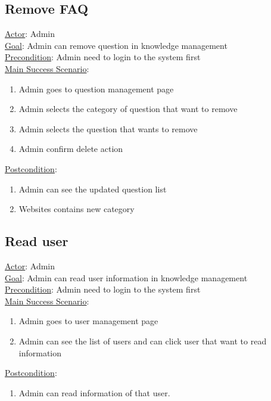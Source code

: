 \documentclass[12pt,oneside,openright,a4paper]{cpe-english-project}
\begin{document}
\subsection{Remove FAQ}
\underline{Actor}: Admin\\
\underline{Goal}: Admin can remove question in knowledge management\\
\underline{Precondition}: Admin need to login to the system first\\
\underline{Main Success Scenario}:
\begin{enumerate}[label={\arabic*.}]
	\item Admin goes to question management page
	\item Admin selects the category of question that want to remove
	\item Admin selects the question that wants to remove
	\item Admin confirm delete action
\end{enumerate}
\underline{Postcondition}: 
\begin{enumerate}[label={\arabic*.}]
	\item Admin can see the updated question list
	\item Websites contains new category
\end{enumerate}

\subsection{Read user}
\underline{Actor}: Admin\\
\underline{Goal}: Admin can read user information in knowledge management\\
\underline{Precondition}: Admin need to login to the system first\\
\underline{Main Success Scenario}:
\begin{enumerate}[label={\arabic*.}]
	\item Admin goes to user management page
	\item Admin can see the list of users and can click user that want to read information
\end{enumerate}
\underline{Postcondition}: 
\begin{enumerate}[label={\arabic*.}]
	\item Admin can read information of that user.
\end{enumerate}
\end{document}
